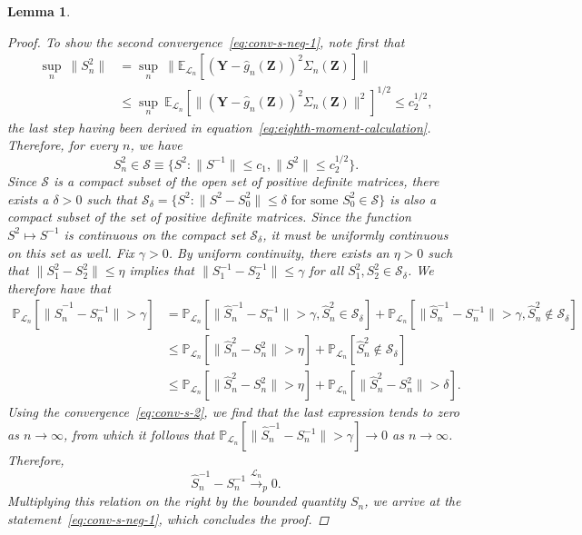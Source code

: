 \documentclass[ejs]{imsart}
\numberwithin{equation}{section}
\theoremstyle{plain}
\newtheorem{lemma}{Lemma}
\theoremstyle{definition}
\theoremstyle{remark}
\newcommand{\prz}{\bm Z}
\newcommand{\pry}{{\bm Y}}
\begin{document}
\begin{lemma}
\begin{proof}
		To show the second convergence~\eqref{eq:conv-s-neg-1}, note first that 
		\begin{equation}
			\begin{split}
				\sup_n\ \|S_n^2\| &= \sup_n\ \|\mathbb E_{\mathcal L_n}[(\pry - \widehat g_n(\prz))^2\Sigma_n(\prz)]\| \\
				&\leq  \sup_n\ \mathbb E_{\mathcal L_n}[\|(\pry - \widehat g_n(\prz))^2\Sigma_n(\prz)\|^2]^{1/2} \leq c_2^{1/2},
			\end{split}
		\end{equation}
		the last step having been derived in equation~\eqref{eq:eighth-moment-calculation}. Therefore, for every $n$, we have
		\begin{equation}
			S_n^2 \in \mathcal S \equiv \{S^2: \|S^{-1}\| \leq c_1, \|S^2\| \leq c_2^{1/2}\}.
		\end{equation}
		Since $\mathcal S$ is a compact subset of the open set of positive definite matrices, there exists a $\delta > 0$ such that
		$\mathcal S_\delta = \{S^2: \|S^2-S_0^2\| \leq \delta \text{ for some } S_0^2 \in \mathcal S\}$ is also a compact subset of the set of positive definite matrices. Since the function $S^2 \mapsto S^{-1}$ is continuous on the compact set $\mathcal S_\delta$, it must be uniformly continuous on this set as well. Fix $\gamma > 0$. By uniform continuity, there exists an $\eta > 0$ such that $\|S^2_1 - S^2_2\| \leq \eta$ implies that $\|S^{-1}_1-S^{-1}_2\| \leq \gamma$ for all $S_1^2, S_2^2 \in \mathcal S_\delta$. We therefore have that
		\begin{equation*}
			\begin{split}
				\mathbb P_{\mathcal L_n}[\|\widehat S_n^{-1} - S_n^{-1}\| > \gamma] &= \mathbb P_{\mathcal L_n}[\|\widehat S_n^{-1} - S_n^{-1}\| > \gamma, \widehat S_n^2 \in \mathcal S_\delta] +  \mathbb P_{\mathcal L_n}[\|\widehat S_n^{-1} - S_n^{-1}\| > \gamma, \widehat S_n^2 \not \in \mathcal S_\delta] \\
				&\leq \mathbb P_{\mathcal L_n}[\|\widehat S_n^{2} - S_n^{2}\| > \eta] +  \mathbb P_{\mathcal L_n}[\widehat S_n^2 \not \in \mathcal S_\delta] \\
				&\leq \mathbb P_{\mathcal L_n}[\|\widehat S_n^{2} - S_n^{2}\| > \eta] +  \mathbb P_{\mathcal L_n}[\|\widehat S_n^2-S_n^2\| > \delta].
			\end{split}
		\end{equation*}
		Using the convergence~\eqref{eq:conv-s-2}, we find that the last expression tends to zero as $n \rightarrow \infty$, from which it follows that $\mathbb P_{\mathcal L_n}[\|\widehat S_n^{-1} - S_n^{-1}\| > \gamma]  \rightarrow 0$ as $n \rightarrow \infty$. Therefore,
		\begin{equation*}
			\widehat S_n^{-1} - S_n^{-1}  \overset{\mathcal L_n}\rightarrow_p 0.
		\end{equation*}
		Multiplying this relation on the right by the bounded quantity $S_n$, we arrive at the statement~\eqref{eq:conv-s-neg-1}, which concludes the proof.
	\end{proof}
	
\end{lemma}
\end{document}

